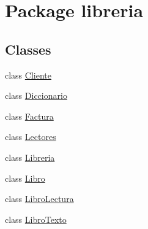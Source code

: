 \hypertarget{namespacelibreria}{}\section{Package libreria}
\label{namespacelibreria}
\subsection*{Classes}
\begin{DoxyCompactItemize}
\item 
class \mbox{\hyperlink{classlibreria_1_1_cliente}{Cliente}}
\item 
class \mbox{\hyperlink{classlibreria_1_1_diccionario}{Diccionario}}
\item 
class \mbox{\hyperlink{classlibreria_1_1_factura}{Factura}}
\item 
class \mbox{\hyperlink{classlibreria_1_1_lectores}{Lectores}}
\item 
class \mbox{\hyperlink{classlibreria_1_1_libreria}{Libreria}}
\item 
class \mbox{\hyperlink{classlibreria_1_1_libro}{Libro}}
\item 
class \mbox{\hyperlink{classlibreria_1_1_libro_lectura}{Libro\+Lectura}}
\item 
class \mbox{\hyperlink{classlibreria_1_1_libro_texto}{Libro\+Texto}}
\end{DoxyCompactItemize}
